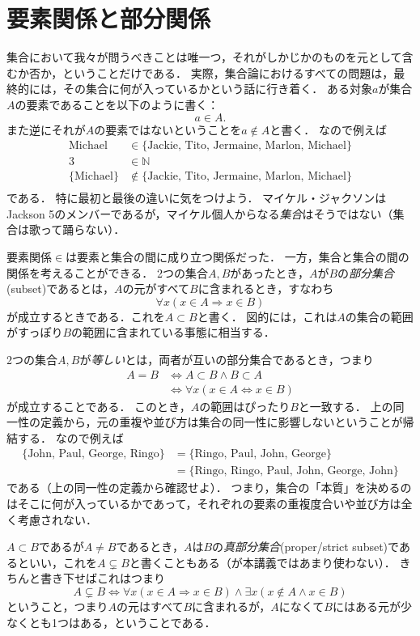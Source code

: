 \documentclass[11pt,a4paper]{jsarticle}
\begin{document}
\section{要素関係と部分関係}
集合において我々が問うべきことは唯一つ，それがしかじかのものを元として含むか否か，ということだけである．
実際，集合論におけるすべての問題は，最終的には，その集合に何が入っているかという話に行き着く．
ある対象$a$が集合$A$の要素であることを以下のように書く：
\[
 a \in A.
\]
また逆にそれが$A$の要素ではないということを$a \not \in A$と書く．
なので例えば
\begin{align*}
\text{Michael} &\in \{ \text{Jackie, Tito, Jermaine, Marlon, Michael}\}  \\
3 &\in \mathbb{N} \\
\{ \text{Michael} \} &\not\in \{ \text{Jackie, Tito, Jermaine, Marlon, Michael}\}  \\
\end{align*}
である．
特に最初と最後の違いに気をつけよう．
マイケル・ジャクソンはJackson 5のメンバーであるが，マイケル個人からなる\emph{集合}はそうではない（集合は歌って踊らない）．

要素関係$\in$は要素と集合の間に成り立つ関係だった．
一方，集合と集合の間の関係を考えることができる．
2つの集合$A, B$があったとき，$A$が$B$の\emph{部分集合}(subset)であるとは，$A$の元がすべて$B$に含まれるとき，すなわち
\[
 \forall x (x \in A \Rightarrow x \in B)
\]
が成立するときである．これを$A \subset B$と書く．
図的には，これは$A$の集合の範囲がすっぽり$B$の範囲に含まれている事態に相当する．

2つの集合$A,B$が\emph{等しい}とは，両者が互いの部分集合であるとき，つまり
\begin{align*}
 A = B &\iff A \subset B \wedge B \subset A \\
&\iff \forall x (x \in A \iff x \in B)
\end{align*}
 が成立することである．
このとき，$A$の範囲はぴったり$B$と一致する．
上の同一性の定義から，元の重複や並び方は集合の同一性に影響しないということが帰結する．
なので例えば
\begin{align*}
 \{\text{John, Paul, George, Ringo}\} 
 &= \{\text{Ringo, Paul, John, George}\} \\
 &= \{\text{Ringo, Ringo, Paul, John, George, John}\}
\end{align*}
である（上の同一性の定義から確認せよ）．
つまり，集合の「本質」を決めるのはそこに何が入っているかであって，それぞれの要素の重複度合いや並び方は全く考慮されない．

$A \subset B$であるが$A \neq B$であるとき，$A$は$B$の\emph{真部分集合}(proper/strict subset)であるといい，これを$A \subsetneq B$と書くこともある（が本講義ではあまり使わない）．
きちんと書き下せばこれはつまり
\[
A \subsetneq B \iff \forall x (x \in A \Rightarrow x \in B) \wedge \exists x (x \not\in A \wedge x \in B)
\]
ということ，つまり$A$の元はすべて$B$に含まれるが，$A$になくて$B$にはある元が少なくとも1つはある，ということである．
\end{document}
